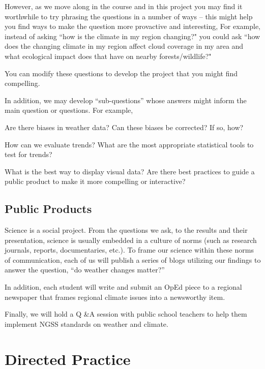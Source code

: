 \documentclass{article}\usepackage[]{graphicx}\usepackage[]{color}
\newenvironment{itemize*}%
  {\begin{itemize}%
    \setlength{\itemsep}{0pt}%
    \setlength{\parskip}{0pt}}%
  {\end{itemize}}
\begin{document}
However, as we move along in the course and in this project you may find it worthwhile to try phrasing the questions in a number of ways -- this might help you find ways to make the question more provactive and interesting, For example, instead of asking ``how is the climate in my region changing?" you could ask ``how does the changing climate in my region affect cloud coverage in my area and what ecological impact does that have on nearby forests/wildlife?"

You can modify these questions to develop the project that you might find compelling.

In addition, we may develop ``sub-questions'' whose answers might inform the main question or questions. For example, 

\begin{itemize*}
  \item Are there biases in weather data? Can these biases be corrected? If so, how?
  \item How can we evaluate trends? What are the most appropriate statistical tools to test for trends?
  \item What is the best way to display visual data?  Are there best practices to guide a public product to make it more compelling or interactive?
\end{itemize*}

\subsection{Public Products}

Science is a social project. From the questions we ask, to the results and their presentation, science is usually embedded in a culture of norms (such as research journals, reports, documentaries, etc.). To frame our science within these norms of communication, each of us will publish a series of blogs utilizing our findings to answer the question, ``do weather changes matter?''

In addition, each student will write and submit an OpEd piece to a regional newspaper that frames regional climate issues into a newsworthy item.

Finally, we will hold a Q \&A session with public school teachers to help them implement NGSS standards on weather and climate.

\section{Directed Practice}
\end{document}

